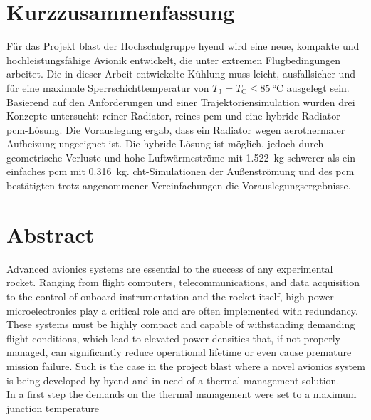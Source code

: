\chapter*{Kurzzusammenfassung} %
\label{chap:Kurzzusammenfassung}


Für das Projekt \ac{blast} der Hochschulgruppe \ac{hyend} wird eine neue, kompakte und hochleistungsfähige Avionik entwickelt,
die unter extremen Flugbedingungen arbeitet. Die in dieser Arbeit entwickelte Kühlung muss leicht, ausfallsicher und für eine
maximale Sperrschichttemperatur von $T_\mathrm{J} = T_\mathrm{C} \leq \SI{85}{\celsius}$ ausgelegt sein.
Basierend auf den Anforderungen und einer Trajektoriensimulation
wurden drei Konzepte untersucht: reiner Radiator, reines \ac{pcm} und eine hybride Radiator-\ac{pcm}-Lösung. Die Vorauslegung
ergab, dass ein Radiator wegen aerothermaler Aufheizung ungeeignet ist. Die hybride Lösung ist möglich, jedoch durch geometrische
Verluste und hohe Luftwärmeströme mit \SI{1.522}{\kilogram} schwerer als ein einfaches \ac{pcm} mit \SI{0.316}{\kilogram}.
\ac{cht}-Simulationen der Außenströmung und des \ac{pcm}
bestätigten trotz angenommener Vereinfachungen die Vorauslegungsergebnisse.

\chapter*{Abstract} %
\label{chap:Abstract}
Advanced avionics systems are essential to the success of any experimental rocket.
Ranging from flight computers, telecommunications, and data acquisition to the control
of onboard instrumentation and the rocket itself, high-power microelectronics play a critical role and are often implemented with redundancy.
These systems must be highly compact and capable of withstanding demanding flight conditions, which lead to elevated
power densities that, if not properly managed, can significantly reduce operational lifetime or even cause premature mission failure.
Such is the case in the project \ac{blast} where a novel avionics system is being developed by \ac{hyend} and in need of a thermal management solution.\\

In a first step the demands on the thermal management were set to a maximum junction temperature